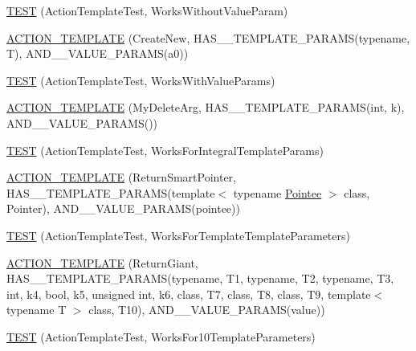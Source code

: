 \begin{DoxyCompactItemize}
\item 
\hyperlink{namespacetesting_1_1gmock__generated__actions__test_aaac879cbe00638dcc2d4733760180a4f}{T\+E\+ST} (Action\+Template\+Test, Works\+Without\+Value\+Param)
\item 
\hyperlink{namespacetesting_1_1gmock__generated__actions__test_a38fb8047f95126bb0b2cfe7e670c8af7}{A\+C\+T\+I\+O\+N\+\_\+\+T\+E\+M\+P\+L\+A\+TE} (Create\+New, H\+A\+S\+\_\+\_\+\+T\+E\+M\+P\+L\+A\+T\+E\+\_\+\+P\+A\+R\+A\+MS(typename, T), A\+N\+D\+\_\+\_\+\+V\+A\+L\+U\+E\+\_\+\+P\+A\+R\+A\+MS(a0))
\item 
\hyperlink{namespacetesting_1_1gmock__generated__actions__test_a21f6e2ad5c4c1afecca93a42c9a84f1a}{T\+E\+ST} (Action\+Template\+Test, Works\+With\+Value\+Params)
\item 
\hyperlink{namespacetesting_1_1gmock__generated__actions__test_aaaac0fbf0bf2c7bd8fc104310e6af25c}{A\+C\+T\+I\+O\+N\+\_\+\+T\+E\+M\+P\+L\+A\+TE} (My\+Delete\+Arg, H\+A\+S\+\_\+\_\+\+T\+E\+M\+P\+L\+A\+T\+E\+\_\+\+P\+A\+R\+A\+MS(int, k), A\+N\+D\+\_\+\_\+\+V\+A\+L\+U\+E\+\_\+\+P\+A\+R\+A\+MS())
\item 
\hyperlink{namespacetesting_1_1gmock__generated__actions__test_aad8d77a35ac21f366dc334a45cf5b140}{T\+E\+ST} (Action\+Template\+Test, Works\+For\+Integral\+Template\+Params)
\item 
\hyperlink{namespacetesting_1_1gmock__generated__actions__test_ad99d926be507eb0c031538da2e8bb838}{A\+C\+T\+I\+O\+N\+\_\+\+T\+E\+M\+P\+L\+A\+TE} (Return\+Smart\+Pointer, H\+A\+S\+\_\+\_\+\+T\+E\+M\+P\+L\+A\+T\+E\+\_\+\+P\+A\+R\+A\+MS(template$<$ typename \hyperlink{namespacetesting_a5122ca3533f3a00f67e146dd81f3b68c}{Pointee} $>$ class, Pointer), A\+N\+D\+\_\+\_\+\+V\+A\+L\+U\+E\+\_\+\+P\+A\+R\+A\+MS(pointee))
\item 
\hyperlink{namespacetesting_1_1gmock__generated__actions__test_a8908d6badc9054adebdaf5ed8d455c2d}{T\+E\+ST} (Action\+Template\+Test, Works\+For\+Template\+Template\+Parameters)
\item 
\hyperlink{namespacetesting_1_1gmock__generated__actions__test_aea61dba8f93605f3e8c1cdedfd1079f5}{A\+C\+T\+I\+O\+N\+\_\+\+T\+E\+M\+P\+L\+A\+TE} (Return\+Giant, H\+A\+S\+\_\+\_\+\+T\+E\+M\+P\+L\+A\+T\+E\+\_\+\+P\+A\+R\+A\+MS(typename, T1, typename, T2, typename, T3, int, k4, bool, k5, unsigned int, k6, class, T7, class, T8, class, T9, template$<$ typename T $>$ class, T10), A\+N\+D\+\_\+\_\+\+V\+A\+L\+U\+E\+\_\+\+P\+A\+R\+A\+MS(value))
\item 
\hyperlink{namespacetesting_1_1gmock__generated__actions__test_a39707e50b998b0866ea7dec54099f38f}{T\+E\+ST} (Action\+Template\+Test, Works\+For10\+Template\+Parameters)

\end{DoxyCompactItemize}
